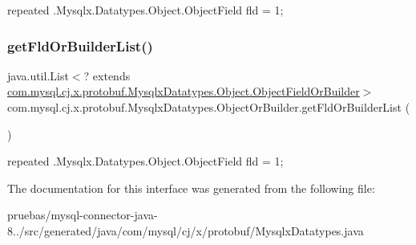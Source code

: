 {\ttfamily repeated .Mysqlx.\+Datatypes.\+Object.\+Object\+Field fld = 1;} \mbox{\label{interfacecom_1_1mysql_1_1cj_1_1x_1_1protobuf_1_1_mysqlx_datatypes_1_1_object_or_builder_a875d79fe453aa509490efd21f9b9edb8}} 
\subsubsection{\texorpdfstring{get\+Fld\+Or\+Builder\+List()}{getFldOrBuilderList()}}
{\footnotesize\ttfamily java.\+util.\+List$<$? extends \mbox{\hyperlink{interfacecom_1_1mysql_1_1cj_1_1x_1_1protobuf_1_1_mysqlx_datatypes_1_1_object_1_1_object_field_or_builder}{com.\+mysql.\+cj.\+x.\+protobuf.\+Mysqlx\+Datatypes.\+Object.\+Object\+Field\+Or\+Builder}}$>$ com.\+mysql.\+cj.\+x.\+protobuf.\+Mysqlx\+Datatypes.\+Object\+Or\+Builder.\+get\+Fld\+Or\+Builder\+List (\begin{DoxyParamCaption}{ }\end{DoxyParamCaption})}

{\ttfamily repeated .Mysqlx.\+Datatypes.\+Object.\+Object\+Field fld = 1;} 

The documentation for this interface was generated from the following file\+:\begin{DoxyCompactItemize}
\item 
pruebas/mysql-\/connector-\/java-\/8../src/generated/java/com/mysql/cj/x/protobuf/Mysqlx\+Datatypes.\+java\end{DoxyCompactItemize}
